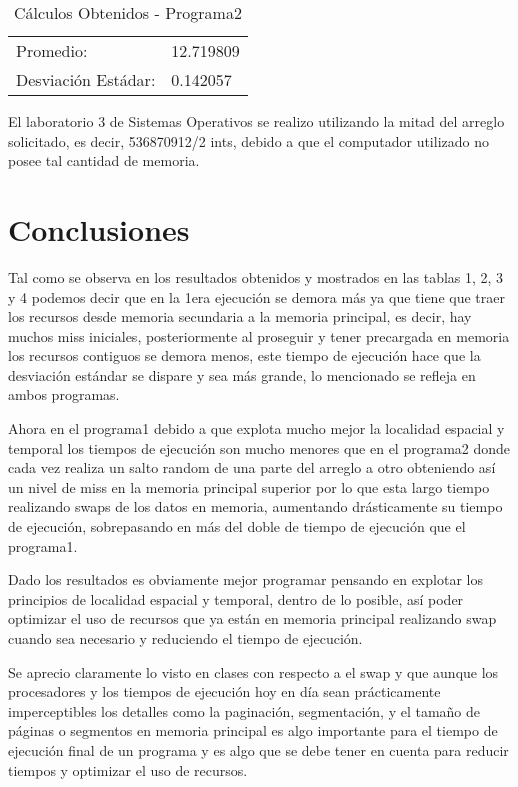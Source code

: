 \documentclass{article}
\begin{document}
\begin{table}[h]
\centering
\caption{Cálculos Obtenidos - Programa2}
\label{resultadosProg2}
\begin{tabular}{ll}
Promedio:           & 12.719809 \\
Desviación Estádar: & 0.142057
\end{tabular}
\end{table}
\newpage
El laboratorio 3 de Sistemas Operativos se realizo utilizando la mitad del arreglo solicitado, es decir, 536870912/2 ints, debido a que el computador utilizado no posee tal cantidad de memoria.

\section{Conclusiones}
Tal como se observa en los resultados obtenidos y mostrados en las tablas 1, 2, 3 y 4 podemos decir que en la 1era ejecución se demora más ya que tiene que traer los recursos desde memoria secundaria a la memoria principal, es decir, hay muchos miss iniciales, posteriormente al proseguir y tener precargada en memoria los recursos contiguos se demora menos, este tiempo de ejecución hace que la desviación estándar se dispare y sea más grande, lo mencionado se refleja en ambos programas.

Ahora en el programa1 debido a que explota mucho mejor la localidad espacial y temporal los tiempos de ejecución son mucho menores que en el programa2 donde cada vez realiza un salto random de una parte del arreglo a otro obteniendo así un nivel de miss en la memoria principal superior por lo que esta largo tiempo realizando swaps de los datos en memoria, aumentando drásticamente su tiempo de ejecución, sobrepasando en más del doble de tiempo de ejecución que el programa1.

Dado los resultados es obviamente mejor programar pensando en explotar los principios de localidad espacial y temporal, dentro de lo posible, así poder optimizar el uso de recursos que ya están en memoria principal realizando swap cuando sea necesario y reduciendo el tiempo de ejecución.

Se aprecio claramente lo visto en clases con respecto a el swap y que aunque los procesadores y los tiempos de ejecución hoy en día sean prácticamente imperceptibles los detalles como la paginación, segmentación, y el tamaño de páginas o segmentos en memoria principal es algo importante para el tiempo de ejecución final de un programa y es algo que se debe tener en cuenta para reducir tiempos y optimizar el uso de recursos.
\end{document}
